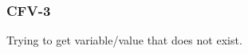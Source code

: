 \subsubsection{CFV-3}\label{sec:error_code_cfv_3}

Trying to get variable/value that does not exist.


